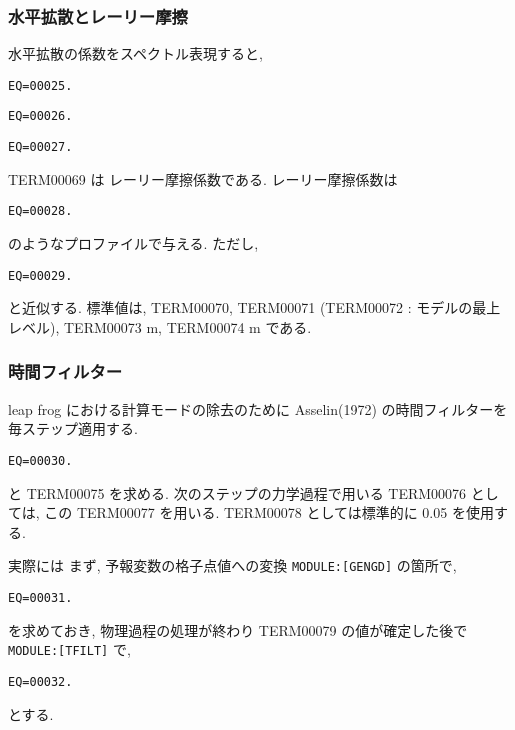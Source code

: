 \subsubsection{水平拡散とレーリー摩擦}

水平拡散の係数をスペクトル表現すると,

\begin{verbatim}
EQ=00025.
\end{verbatim}
%
\begin{verbatim}
EQ=00026.
\end{verbatim}
%
\begin{verbatim}
EQ=00027.
\end{verbatim}

TERM00069 は レーリー摩擦係数である.
レーリー摩擦係数は
\begin{verbatim}
EQ=00028.
\end{verbatim}
のようなプロファイルで与える.
ただし,
\begin{verbatim}
EQ=00029.
\end{verbatim}
と近似する.
標準値は, TERM00070,
TERM00071 (TERM00072 : モデルの最上レベル),
TERM00073 m,
TERM00074 m である.

\subsubsection{時間フィルター}


leap frog における計算モードの除去のために 
Asselin(1972) の時間フィルターを毎ステップ適用する.
%
\begin{verbatim}
EQ=00030.
\end{verbatim}
%
と TERM00075 を求める.
次のステップの力学過程で用いる TERM00076 としては,
この TERM00077 を用いる.
TERM00078 としては標準的に 0.05 を使用する. 

実際には
まず, 予報変数の格子点値への変換 \texttt{MODULE:[GENGD]} の箇所で,
\begin{verbatim}
EQ=00031.
\end{verbatim}
を求めておき, 物理過程の処理が終わり
TERM00079 の値が確定した後で \texttt{MODULE:[TFILT]} で,
\begin{verbatim}
EQ=00032.
\end{verbatim}
とする.
